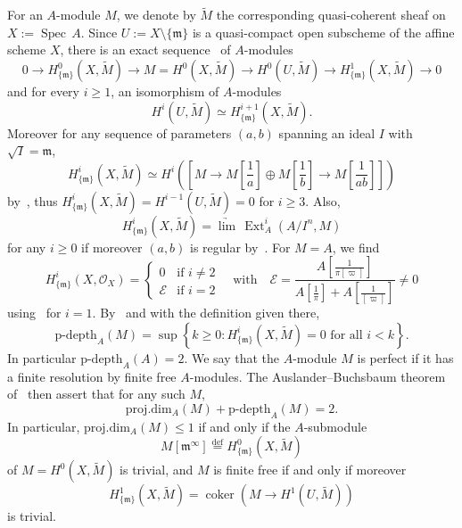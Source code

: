 \documentclass[11pt]{article}
\theoremstyle{definition}
\numberwithin{equation}{section}
\numberwithin{figure}{section}
\numberwithin{table}{section}
\DeclareMathOperator{\Spec}{Spec}
\DeclareMathOperator{\Ext}{Ext}
\DeclareMathOperator{\coker}{coker}
\newcommand{\eqd}{\stackrel{\mathrm{def}}{=}}
\let\tilde\widetilde
\begin{document}
For an $A$-module $M$, we denote by $\tilde{M}$ the corresponding quasi-coherent sheaf on $X:=\Spec\,A$. Since $U:=X\setminus\{\mathfrak{m}\}$ is a quasi-compact open subscheme of the affine scheme $X$, there is an exact sequence~\cite[II Corollaire~4]{SGA2r} of $A$-modules
\[
0\rightarrow H_{\{\mathfrak{m}\}}^{0}(X,\tilde{M})\rightarrow M=H^{0}(X,\tilde{M})\rightarrow H^{0}(U,\tilde{M})\rightarrow H_{\{\mathfrak{m}\}}^{1}(X,\tilde{M})\rightarrow0
\]
and for every $i\geq1$, an isomorphism of $A$-modules
\[
H^{i}(U,\tilde{M})\simeq H_{\{\mathfrak{m}\}}^{i+1}(X,\tilde{M}).
\]
Moreover for any sequence of parameters $(a,b)$ spanning an ideal $I$ with $\sqrt{I}=\mathfrak{m}$,
\[
H_{\{\mathfrak{m}\}}^{i}(X,\tilde{M})\simeq H^{i}\left(\left[M\rightarrow M\left[{\frac{1}{a}}\right]\oplus M\left[{\frac{1}{b}}\right]\rightarrow M\left[{\frac{1}{ab}}\right]\right]\right)
\]
by~\cite[II Proposition~5]{SGA2r}, thus $H_{\{\mathfrak{m}\}}^{i}(X,\tilde{M})=H^{i-1}(U,\tilde{M})=0$ for $i\geq3$. Also,
\[
H_{\{\mathfrak{m}\}}^{i}(X,\tilde{M})=\underrightarrow{\lim}\,\Ext_{A}^{i}\left(A/I^{n},M\right)
\]
for any $i\geq0$ if moreover $(a,b)$ is regular by~\cite[II Lemme~9]{SGA2r}. For $M=A$, we find
\[
H_{\{\mathfrak{m}\}}^{i}\left(X,\mathcal{O}_{X}\right)=
\begin{cases}
0 & \text{if }i\neq2\\
\mathcal{E} & \text{if }i=2
\end{cases}\quad\text{with}\quad\mathcal{E}=\frac{A\left[{\frac{1}{\pi[\varpi]}}\right]}{A\left[{\frac{1}{\pi}}\right]+A\left[{\frac{1}{[\varpi]}}\right]}\neq0
\]
using~\cite[4.6]{BaMoSc16} for $i=1$. By~\cite[2.6 \& 2.7]{HaMa07} and with the definition given there,
\[
\text{p-depth}_{A}(M)=\sup\left\{ k\geq0:H_{\{\mathfrak{m}\}}^{i}\left(X,\tilde{M}\right)=0\text{ for all }i<k\right\}.
\]
In particular $\text{p-depth}_{A}(A)=2$. We say that the $A$-module $M$ is perfect if it has a finite resolution by finite free $A$-modules. The Auslander--Buchsbaum theorem of~\cite[Chapter~6, Theorem~2]{No76} then assert that for any such $M$,
\[
\text{proj}.\text{dim}_{A}(M)+\text{p-depth}_{A}(M)=2.
\]
In particular, $\text{proj}.\text{dim}_{A}(M)\leq1$ if and only if the $A$-submodule
\[
M[\mathfrak{m}^{\infty}]\eqd H_{\{\mathfrak{m}\}}^{0}(X,\tilde{M})
\]
of $M=H^{0}(X,\tilde{M})$ is trivial, and $M$ is finite free if and only if moreover
\[
H_{\{\mathfrak{m}\}}^{1}(X,\tilde{M})=\coker\left(M\rightarrow H^{1}(U,\tilde{M})\right)
\]
is trivial.

\subsubsection{}\label{subsec:basicsonModA*}
\end{document}
